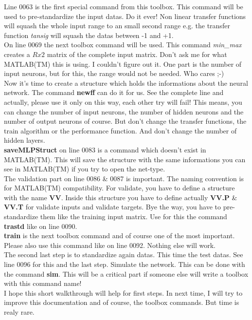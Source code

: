 Line 0063 is the first special command from this toolbox. This command will be used to pre-standardize the input datas. Do it ever! Non linear transfer functions will squash the whole input range to an small second range e.g. the transfer function \textit{tansig} will squash the datas between -1 and +1.\\

On line 0069 the next toolbox command will be used. This command \textit{min\_max} creates a $Rx2$ matrix of the complete input matrix. Don't ask me for what MATLAB(TM) this is using. I couldn't figure out it. One part is the number of input neurons, but for this, the range would not be needed. Who cares ;-)\\

Now it's time to create a structure which holds the informations about the neural network. The command \textbf{newff} can do it for us. See the complete line and actually, please use it only on this way, each other try will fail! This means, you can change the number of input neurons, the number of hidden neurons and the number of output neurons of course. But don't change the transfer functions, the train algorithm or the performance function. And don't change the number of hidden layers.\\

\textbf{saveMLPStruct} on line 0083 is a command which doesn't exist in MATLAB(TM). This will save the structure with the same informations you can see in MATLAB(TM) if you try to open the net-type.\\

The validation part on line 0086 \& 0087 is important. The naming convention is for MATLAB(TM) compatibility. For validate, you have to define a structure with the name \textbf{VV}. Inside this structure you have to define actually \textbf{VV.P} \& \textbf{VV.T} for validate inputs and validate targets. Bye the way, you have to pre-standardize them like the training input matrix. Use for this the command \textbf{trastd} like on line 0090.\\

\textbf{train} is the next toolbox command and of course one of the most important. Please also use this command like on line 0092. Nothing else will work.\\

The second last step is to standardize again datas. This time the test datas. See line 0096 for this and the last step. Simulate the network. This can be done with the command \textbf{sim}. This will be a critical part if someone else will write a toolbox with this command name!\\

I hope this short walkthrough will help for first steps. In next time, I will try to improve this documentation and of course, the toolbox commands. But time is realy rare.


